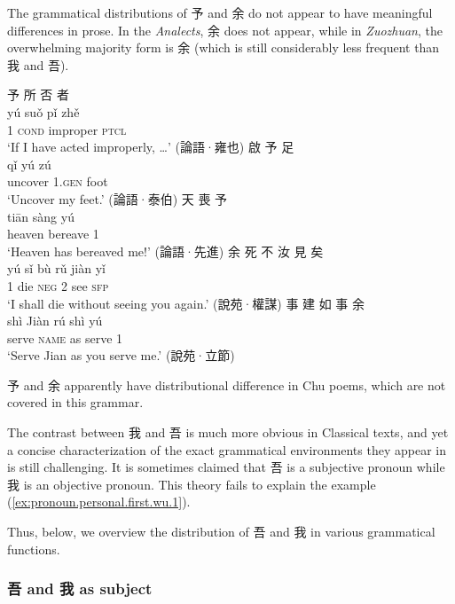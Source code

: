 \documentclass[UTF8, a4paper, oneside, scheme=plain, 12pt]{ctexrep}
\newcommand{\work}[1]{\textit{#1}}
\newcommand{\translate}[1]{`#1'}
\newcommand*{\category}[1]{\textsc{#1}}
\begin{document}
The grammatical distributions of 予 and 余 do not appear to have meaningful differences in prose.
In the \work{Analects}, 余 does not appear,
while in \work{Zuozhuan}, the overwhelming majority form is 余 (which is still considerably less frequent than 我 and 吾).

\begin{exe}
    \ex
    \glll 予 所 否 者 \\
    yú suǒ pǐ zhě \\
    1 \category{cond} improper \category{ptcl} \\
    \glt\translate{If I have acted improperly, \dots} \hfill (論語·雍也)
    \ex
    \glll 啟 予 足 \\
    qǐ yú zú \\
    uncover 1.\category{gen} foot \\
    \glt\translate{Uncover my feet.} \hfill (論語·泰伯)
    \ex
    \glll 天 喪 予 \\
    tiān sàng yú \\
    heaven bereave 1 \\
    \glt\translate{Heaven has bereaved me!} \hfill (論語·先進)
    \ex
    \glll 余 死 不 汝 見 矣 \\
    yú sǐ bù rǔ jiàn yǐ \\
    1 die \category{neg} 2 see \category{sfp} \\
    \glt\translate{I shall die without seeing you again.} \hfill (說苑·權謀)
    \ex
    \glll 事 建 如 事 余 \\
    shì Jiàn rú shì yú \\
    serve \category{name} as serve 1 \\
    \glt\translate{Serve Jian as you serve me.} \hfill (說苑·立節)
\end{exe}

予 and 余 apparently have distributional difference in Chu poems, which are not covered in this grammar.

The contrast between 我 and 吾 is much more obvious in Classical texts,
and yet a concise characterization of the exact grammatical environments they appear in is still challenging.
It is sometimes claimed that 吾 is a subjective pronoun while 我 is an objective pronoun.
This theory fails to explain the example (\ref{ex:pronoun.personal.first.wu.1}).




Thus, below, we overview the distribution of 吾 and 我 in various grammatical functions.

\subsubsection{吾 and 我 as subject}
\end{document}
